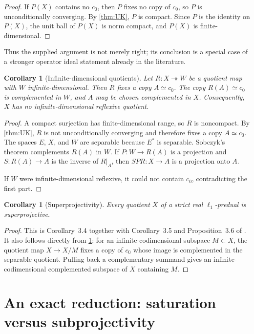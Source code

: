 \documentclass[11pt]{article}
\newtheorem{corollary}[theorem]{Corollary}
\theoremstyle{definition}
\newcommand{\onto}{\twoheadrightarrow}
\newcommand{\isom}{\simeq}
\begin{document}
\begin{proof}
If $P(X)$ contains no $c_0$, then $P$ fixes no copy of $c_0$, so $P$ is
unconditionally converging.  By \cref{thm:UK}, $P$ is compact.  Since $P$ is
the identity on $P(X)$, the unit ball of $P(X)$ is norm compact, and $P(X)$
is finite-dimensional.
\end{proof}

Thus the supplied argument is not merely right; its conclusion is a special
case of a stronger operator ideal statement already in the literature.

\begin{corollary}[Infinite-dimensional quotients]\label{cor:quotients}
Let $R:X\onto W$ be a quotient map with $W$ infinite-dimensional.  Then
$R$ fixes a copy $A\isom c_0$.  The copy $R(A)\isom c_0$ is complemented in
$W$, and $A$ may be chosen complemented in $X$.  Consequently, $X$ has no
infinite-dimensional reflexive quotient.
\end{corollary}

\begin{proof}
A compact surjection has finite-dimensional range, so $R$ is noncompact.
By \cref{thm:UK}, $R$ is not unconditionally converging and therefore fixes
a copy $A\isom c_0$.  The spaces $E$, $X$, and $W$ are separable because
$E^*$ is separable.  Sobczyk's theorem complements $R(A)$ in $W$.  If
$P:W\to R(A)$ is a projection and $S:R(A)\to A$ is the inverse of $R|_A$,
then $SPR:X\to A$ is a projection onto $A$.

If $W$ were infinite-dimensional reflexive, it could not contain $c_0$,
contradicting the first part.
\end{proof}

\begin{corollary}[Superprojectivity]\label{cor:super}
Every quotient $X$ of a strict real $\ell_1$-predual is superprojective.
\end{corollary}

\begin{proof}
This is Corollary~3.4 together with Corollary~3.5 and Proposition~3.6 of
\cite{GalegoGonzalezPello2017}.  It also follows directly from
\cref{cor:quotients}: for an infinite-codimensional subspace $M\subset X$,
the quotient map $X\to X/M$ fixes a copy of $c_0$ whose image is complemented
in the separable quotient.  Pulling back a complementary summand gives an
infinite-codimensional complemented subspace of $X$ containing $M$.
\end{proof}

\section{An exact reduction: saturation versus subprojectivity}
\end{document}

